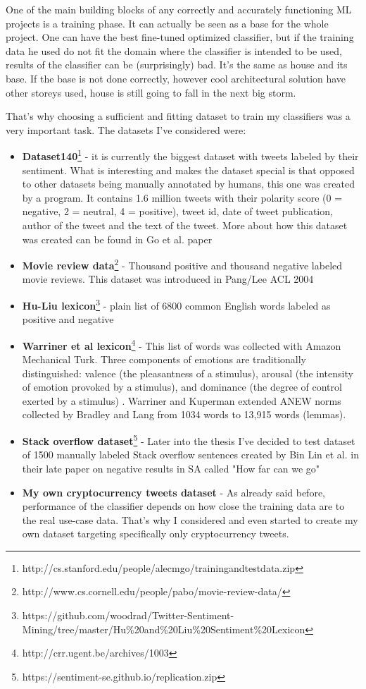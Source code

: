 One of the main building blocks of any correctly and accurately functioning ML projects is a training phase. It can actually be seen as a base for the whole project. One can have the best fine-tuned optimized classifier, but if the training data he used do not fit the domain where the classifier is intended to be used, results of the classifier can be (surprisingly) bad. It's the same as house and its base. If the base is not done correctly, however cool architectural solution have other storeys used, house is still going to fall in the next big storm.

That's why choosing a sufficient and fitting dataset to train my classifiers was a very important task. The datasets I've considered were:
\begin{itemize}
  \item \textbf{Dataset140}\footnote{http://cs.stanford.edu/people/alecmgo/trainingandtestdata.zip} - it is currently the biggest dataset with tweets labeled by their sentiment. What is interesting and makes the dataset special is that opposed to other datasets being manually annotated by humans, this one was created by a program. It contains 1.6 million tweets with their polarity score (0 = negative, 2 = neutral, 4 = positive), tweet id, date of tweet publication, author of the tweet and the text of the tweet. More about how this dataset was created can be found in Go et al. paper \cite{go2009twitter}
  \item \textbf{Movie review data}\footnote{http://www.cs.cornell.edu/people/pabo/movie-review-data/} - Thousand positive and thousand negative labeled movie reviews. This dataset was introduced in Pang/Lee ACL 2004 \cite{pang2004sentimental}
  \item \textbf{Hu-Liu lexicon}\footnote{https://github.com/woodrad/Twitter-Sentiment-Mining/tree/master/Hu\%20and\%20Liu\%20Sentiment\%20Lexicon} - plain list of 6800 common English words labeled as positive and negative
  \item \textbf{Warriner et al lexicon}\footnote{http://crr.ugent.be/archives/1003} - This list of words was collected with Amazon Mechanical Turk. Three components of emotions are traditionally distinguished: valence (the pleasantness of a stimulus), arousal (the intensity of emotion provoked by a stimulus), and dominance (the degree of control exerted by a stimulus) \cite{warriner2013norms}. Warriner and Kuperman extended ANEW norms collected by Bradley and Lang from 1034 words to 13,915 words (lemmas).
  \item \textbf{Stack overflow dataset}\footnote{https://sentiment-se.github.io/replication.zip} - Later into the thesis I've decided to test dataset of 1500 manually labeled Stack overflow sentences created by Bin Lin et al. in their late paper on negative results in SA called "How far can we go"
    \item \textbf{My own cryptocurrency tweets dataset} - As already said before, performance of the classifier depends on how close the training data are to the real use-case data. That's why I considered and even started to create my own dataset targeting specifically only cryptocurrency tweets.
\end{itemize}
